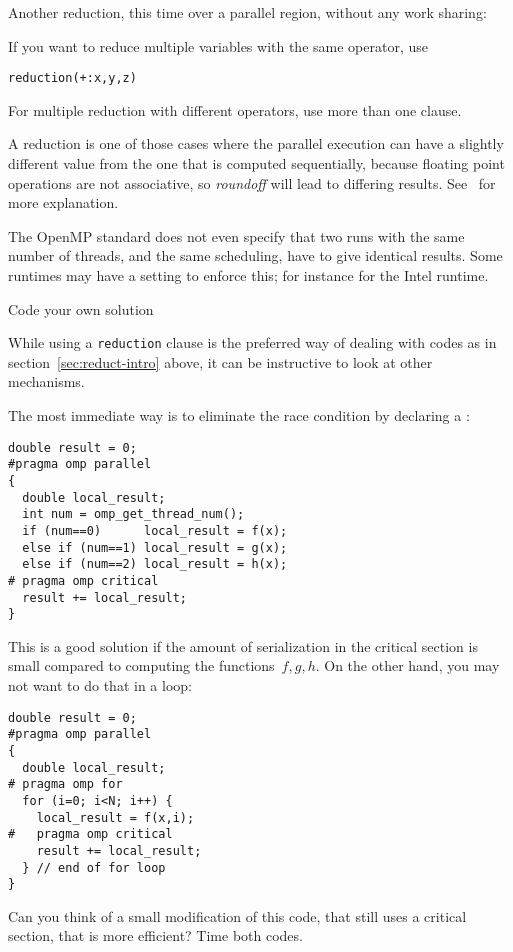 Another reduction, this time over a parallel region,
without any work sharing:
%

If you want to reduce multiple variables with the same operator, use
\begin{lstlisting}
reduction(+:x,y,z)
\end{lstlisting}
For multiple reduction with different operators, use more than one clause.

\begin{remark}
  A reduction is one of those cases where the parallel execution can have a slightly different
  value from the one that is computed sequentially, because floating point operations
  are not associative, so \emph{roundoff}
  will lead to differing results.
  See~ for more explanation.

  The OpenMP standard does not even specify that two runs with the same number of threads,
  and the same scheduling, have to give identical results.
  Some runtimes may have a setting to enforce this;
  for instance  for the Intel runtime.
\end{remark}

 {Code your own solution}

While using a \lstinline{reduction} clause is the preferred way of dealing
with codes as in section~\ref{sec:reduct-intro} above,
it can be instructive to look at other mechanisms.

The most immediate way is to eliminate the race condition
by declaring a :
\begin{lstlisting}
double result = 0;
#pragma omp parallel
{
  double local_result;
  int num = omp_get_thread_num();
  if (num==0)      local_result = f(x);
  else if (num==1) local_result = g(x);
  else if (num==2) local_result = h(x);
# pragma omp critical
  result += local_result;
}
\end{lstlisting}

This is a good solution if the amount of serialization in the critical section
is small compared to computing the functions~$f,g,h$. On the other hand, you
may not want to do that in a loop:
\begin{lstlisting}
double result = 0;
#pragma omp parallel
{
  double local_result;
# pragma omp for
  for (i=0; i<N; i++) {
    local_result = f(x,i);
#   pragma omp critical
    result += local_result;
  } // end of for loop
}
\end{lstlisting}
\begin{exercise}
  Can you think of a small modification of this code, that still uses a critical section,
  that is more efficient? Time both codes.
\end{exercise}

